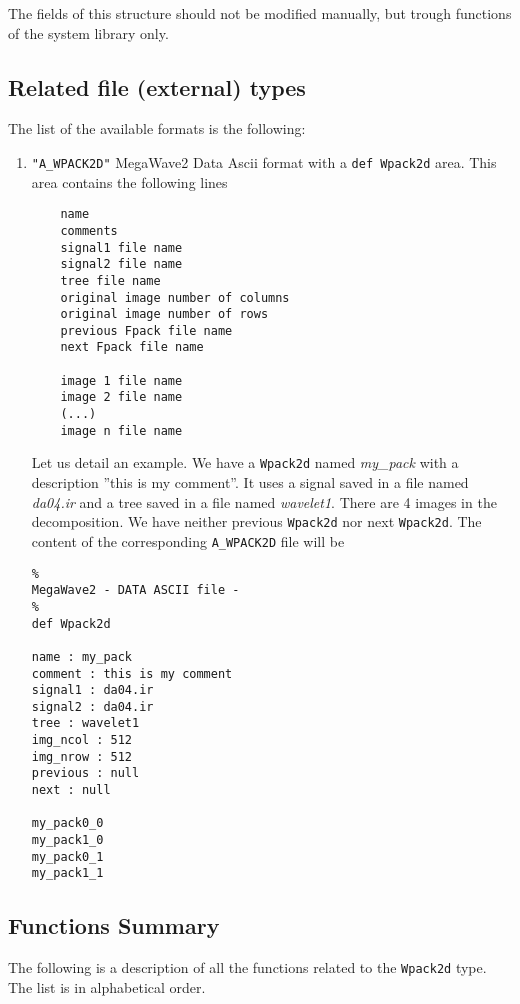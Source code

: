 The fields of this structure should not be modified manually, but trough
functions of the system library only.

\subsection{Related file (external) types}
\label{wavelets_wpack2d-file_type}

The list of the available formats is the following:
\begin{enumerate}
\item \verb+"A_WPACK2D"+ MegaWave2 Data Ascii format with a \verb+def Wpack2d+ area.
This area contains the following lines
\begin{verbatim}
    name
    comments
    signal1 file name
    signal2 file name
    tree file name
    original image number of columns
    original image number of rows
    previous Fpack file name
    next Fpack file name

    image 1 file name
    image 2 file name
    (...)
    image n file name
\end{verbatim}
Let us detail an example. We have a \verb+Wpack2d+
named {\em my\_pack} with a description ''this is my comment''. 
It uses a signal saved in a file named {\em da04.ir} and a tree saved in a file named
{\em wavelet1}. There are 4 images in the decomposition.  We have neither
previous \verb+Wpack2d+  nor next \verb+Wpack2d+. 
The content of the corresponding \verb+A_WPACK2D+ file will be
\begin{verbatim}
%
MegaWave2 - DATA ASCII file -
%
def Wpack2d

name : my_pack
comment : this is my comment
signal1 : da04.ir
signal2 : da04.ir
tree : wavelet1
img_ncol : 512
img_nrow : 512
previous : null
next : null

my_pack0_0
my_pack1_0
my_pack0_1
my_pack1_1
\end{verbatim}

\end{enumerate}

\subsection{Functions Summary}
\label{wavelets_wpack2d_function}

The following is a description of all the functions related to 
the \verb+Wpack2d+ type. The list is in alphabetical order.

\newpage %


